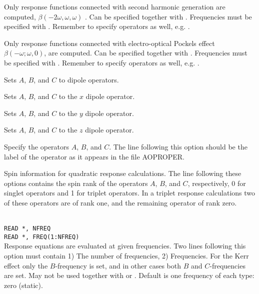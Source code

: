 \begin{description}

\item{}
Only response functions connected with second harmonic
generation
are computed, $\beta(-2\omega,\omega,\omega)$ .
Can be specified together with .
Frequencies must be specified with .
Remember to specify operators as well, e.g. .

\item{}
Only response functions connected with electro-optical
Pockels effect
$\beta(-\omega; \omega,0)$, are computed.
Can be specified together with .
Frequencies must be specified with .
Remember to specify operators as well, e.g. .

\item{}
Sets $A$, $B$, and $C$ to dipole operators.

\item{}
Sets $A$, $B$, and $C$ to the $x$ dipole operator.

\item{}
Sets $A$, $B$, and $C$ to the $y$ dipole operator.

\item{}
Sets $A$, $B$, and $C$ to the $z$ dipole operator.

\item[\Key{APROP}, \Key{BPROP}, \Key{CPROP}]
Specify the operators $A$, $B$, and $C$. The line following this
option should be the label of the operator as it appears in the file
AOPROPER.

\item[\Key{ASPIN}, \Key{BSPIN}, \Key{CSPIN}]
Spin information for quadratic response calculations.
The line following these options contains the spin
rank of the operators 
$A$, $B$, and $C$, respectively, 0 for singlet operators and 1 for triplet
operators.
In a triplet response calculations two of these operators are of rank one,
and the remaining operator of rank zero.

\item{}\\
\verb|READ *, NFREQ|\\
\verb|READ *, FREQ(1:NFREQ)|\\
Response equations are evaluated at given
frequencies. Two lines 
following this option must contain 1) The number of frequencies, 2)
Frequencies.
For the Kerr effect only the $B$-frequency is set,
and in other cases both $B$ and $C$-frequencies are set.
May not be used together with  or .
Default is one frequency of each type: zero (static).


\end{description}
